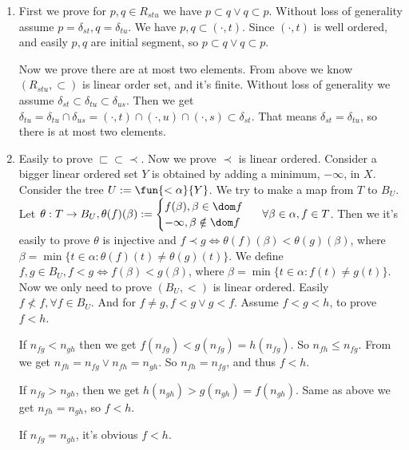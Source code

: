 \documentclass{ctexart}
\begin{document}
\begin{solution}
  \begin{enumerate}
    \item First we prove for \(p,q \in R_{stu} \) we have \(p \subset q \vee q \subset p\). 
      Without loss of generality assume \(p = \delta_{st} ,q=\delta_{tu} \). We have 
      \(p,q \subset (\cdot, t)\). Since \((\cdot,t)\) is well ordered, and easily \(p,q\) are initial segment, 
      so \(p \subset q \vee q \subset p\). 

      Now we prove there are at most two elements. 
      From above we know \((R_{stu},\subset)\) is linear order set, and it's finite. 
      Without loss of generality we assume \(\delta_{st} \subset \delta_{tu} \subset \delta_{us} \). 
      Then we get \(\delta_{tu}=\delta_{tu}\cap \delta_{us}=(\cdot,t)\cap(\cdot,u)\cap(\cdot,s) \subset \delta_{st}\).
      That means \(\delta_{st}=\delta_{tu}\), so there is at most two elements. 
    \item Easily to prove \(\sqsubset \subset \prec \). Now we prove \(\prec\) is linear ordered. 
      Consider a bigger linear ordered set \(Y\) is obtained by adding a minimum, \(-\infty\), in \(X\). 
      Consider the tree \(U:=\fun{<\alpha}{Y}\). We try to make a map from \(T\) to \(B_U\). 
      Let \(\theta:T \to B_U,\theta(f)(\beta):=\begin{cases}
        f(\beta), \beta \in \dom f\\
        -\infty,\beta \notin \dom f
      \end{cases}\,\,\, \forall \beta \in \alpha,f \in T\). 
      Then we it's easily to prove \(\theta\) is injective and \(f \prec g \iff \theta(f)(\beta)< \theta(g)(\beta)\), where \(\beta = \min\{t \in \alpha:\theta(f)(t) \neq \theta(g)(t)\}\). 
      We define \(f,g \in B_U,f <g \iff f(\beta)<g(\beta)\), where \(\beta=\min\{t \in \alpha:f(t)\neq g(t)\}\). 
      Now we only need to prove \((B_U,<)\) is linear ordered. 
      Easily \(f \not< f , \forall f \in B_U\). And for \(f \neq g,f<g \vee g<f\). 
      Assume \(f<g<h\), to prove \(f<h\).

      If \(n_{fg}< n_{gh}\) then we get \(f(n_{fg})<g(n_{fg})=h(n_{fg})\). 
      So \(n_{fh}\leq n_{fg}\). From  we get \(n_{fh}=n_{fg} \vee n_{fh}=n_{gh}\). 
      So \(n_{fh}=n_{fg}\), and thus \(f<h\). 

      If \(n_{fg}>n_{gh}\), then we get \(h(n_{gh})>g(n_{gh})=f(n_{gh})\). Same as above we get \(n_{fh}=n_{gh}\), so \(f<h\). 

      If \(n_{fg}=n_{gh}\), it's obvious \(f<h\). 
      

\end{enumerate}
\end{solution}
\end{document}
